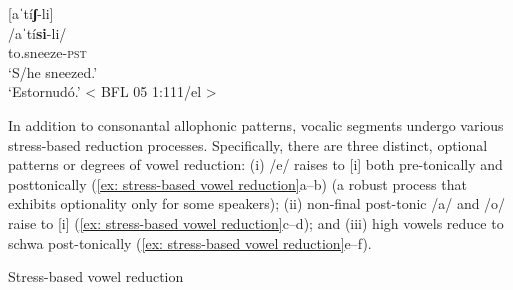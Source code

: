        [aˈtí\textbf{ʃ}-li]  \\
        /aˈtí\textbf{si}-li/    \\
        to.sneeze-\textsc{pst}  \\
        `S/he sneezed.'\\
        `Estornudó.' < BFL 05 1:111/el >  \\

\z

In addition to consonantal allophonic patterns, vocalic segments undergo various stress-based reduction processes. Specifically, there are three distinct, optional patterns or degrees of vowel reduction: (i) /e/ raises to [i] both pre-tonically and posttonically (\ref{ex: stress-based vowel reduction}a--b) (a robust process that exhibits optionality only for some speakers); (ii) non-final post-tonic /a/ and /o/ raise to [i] (\ref{ex: stress-based vowel reduction}c--d); and (iii) high vowels reduce to schwa post-tonically (\ref{ex: stress-based vowel reduction}e--f).

\ea\label{ex: stress-based vowel reduction}
{Stress-based vowel reduction}

